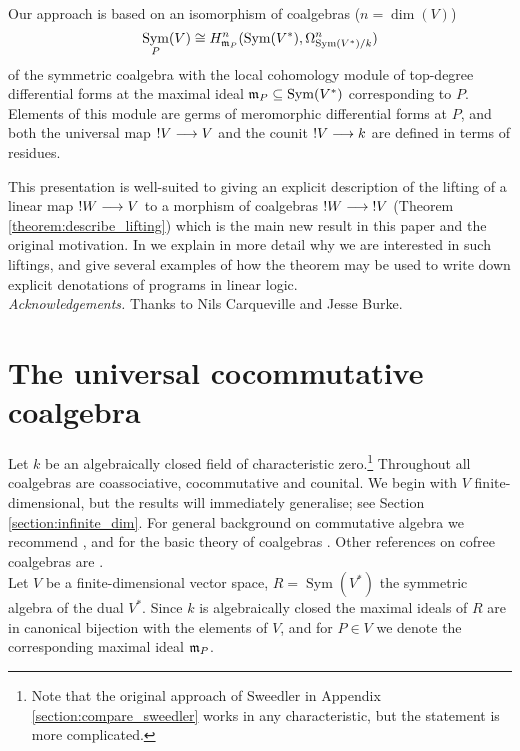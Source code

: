 \documentclass[english,letter paper,12pt,reqno]{article}
\theoremstyle{example}
\numberwithin{equation}{section}
\DeclareMathOperator{\Sym}{Sym}
\begin{document}
Our approach is based on an isomorphism of coalgebras ($n = \dim(V)$)
\begin{equation}\label{eq:lc}
\Sym_P(V) \cong H^{n}_{\mf{m}_P}(\Sym(V^*), \Omega^n_{\Sym(V^*)/k})
\end{equation}
of the symmetric coalgebra with the local cohomology module of top-degree differential forms at the maximal ideal $\mf{m}_P \subseteq \Sym(V^*)$ corresponding to $P$. Elements of this module are germs of meromorphic differential forms at $P$, and both the universal map ${!} V \longrightarrow V$ and the counit ${!} V \longrightarrow k$ are defined in terms of residues.

This presentation is well-suited to giving an explicit description of the lifting of a linear map ${!} W \longrightarrow V$ to a morphism of coalgebras ${!} W \longrightarrow {!} V$ (Theorem \ref{theorem:describe_lifting}) which is the main new result in this paper and the original motivation. In \cite{murfet_ll} we explain in more detail why we are interested in such liftings, and give several examples of how the theorem may be used to write down explicit denotations of programs in linear logic.
\\

\emph{Acknowledgements.} Thanks to Nils Carqueville and Jesse Burke.

\section{The universal cocommutative coalgebra}\label{section:expmod}

Let $k$ be an algebraically closed field of characteristic zero.\footnote{Note that the original approach of Sweedler in Appendix \ref{section:compare_sweedler} works in any characteristic, but the statement is more complicated.} Throughout all coalgebras are coassociative, cocommutative and counital. We begin with $V$ finite-dimensional, but the results will immediately generalise; see Section \ref{section:infinite_dim}. For general background on commutative algebra we recommend \cite{eisenbud}, and for the basic theory of coalgebras \cite{sweedler}. Other references on cofree coalgebras are \cite{getzler, anel, block-leroux, hazewinkel, smith, barr}.
\\

Let $V$ be a finite-dimensional vector space, $R = \Sym(V^*)$ the symmetric algebra of the dual $V^*$. Since $k$ is algebraically closed the maximal ideals of $R$ are in canonical bijection with the elements of $V$, and for $P \in V$ we denote the corresponding maximal ideal $\mathfrak{m}_P$. 
\end{document}
